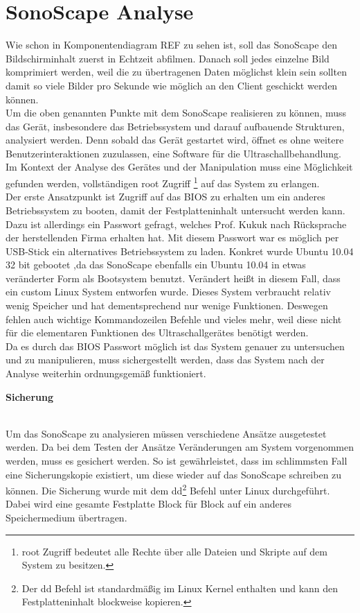 \chapter{SonoScape Analyse}
Wie schon in Komponentendiagram REF zu sehen ist, soll das SonoScape den Bildschirminhalt zuerst in Echtzeit abfilmen. Danach soll jedes einzelne Bild komprimiert werden, weil die zu übertragenen Daten möglichst klein sein sollten damit so viele Bilder pro Sekunde wie möglich an den Client geschickt werden können.\\
Um die oben genannten Punkte mit dem SonoScape realisieren zu können, muss das Gerät, insbesondere das Betriebssystem und darauf aufbauende Strukturen, analysiert werden. Denn sobald das Gerät gestartet wird, öffnet es ohne weitere  Benutzerinteraktionen zuzulassen, eine Software für die Ultraschallbehandlung. Im Kontext der Analyse des Gerätes und der Manipulation muss eine Möglichkeit gefunden werden, vollständigen root Zugriff \footnote{root Zugriff bedeutet alle Rechte über alle Dateien und Skripte auf dem System zu besitzen.} auf das System zu erlangen.\\ 
Der erste Ansatzpunkt ist Zugriff auf das BIOS zu erhalten um ein anderes Betriebssystem zu booten, damit der Festplatteninhalt untersucht werden kann. Dazu ist allerdings ein Passwort gefragt, welches Prof. Kukuk nach Rücksprache der herstellenden Firma erhalten hat. Mit diesem Passwort war es möglich per USB-Stick ein alternatives Betriebssystem zu laden. Konkret wurde Ubuntu 10.04 32 bit gebootet ,da das SonoScape ebenfalls ein Ubuntu 10.04 in etwas veränderter Form als Bootsystem benutzt. Verändert heißt in diesem Fall, dass ein custom Linux System entworfen wurde. Dieses System verbraucht relativ wenig Speicher und hat dementsprechend nur wenige Funktionen. Deswegen fehlen auch wichtige Kommandozeilen Befehle und vieles mehr, weil diese nicht für die elementaren Funktionen des Ultraschallgerätes benötigt werden.\\
Da es durch das BIOS Passwort möglich ist das System genauer zu untersuchen und zu manipulieren, muss sichergestellt werden, dass das System nach der Analyse weiterhin ordnungsgemäß funktioniert. 
\clearpage
\begin{large}
\textbf{Sicherung}\\\\
\end{large}
Um das SonoScape zu analysieren müssen verschiedene Ansätze ausgetestet werden. Da bei dem Testen der Ansätze Veränderungen am System vorgenommen werden, muss es gesichert werden. So ist gewährleistet, dass im schlimmsten Fall eine Sicherungskopie existiert, um diese wieder auf das SonoScape schreiben zu können. Die Sicherung wurde mit dem dd\footnote{Der dd Befehl ist standardmäßig im Linux Kernel enthalten und kann den Festplatteninhalt blockweise kopieren. } Befehl unter Linux durchgeführt. Dabei wird eine gesamte Festplatte Block für Block auf ein anderes Speichermedium übertragen.

